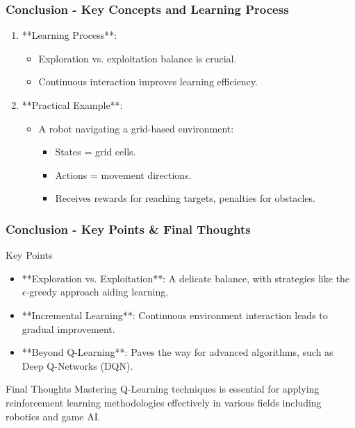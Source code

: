 \documentclass[aspectratio=169]{beamer}
\begin{document}
\begin{frame}[fragile]
    \frametitle{Conclusion - Key Concepts and Learning Process}
    \begin{enumerate}
        \item **Learning Process**:
            \begin{itemize}
                \item Exploration vs. exploitation balance is crucial.
                \item Continuous interaction improves learning efficiency.
            \end{itemize}
        
        \item **Practical Example**:
            \begin{itemize}
                \item A robot navigating a grid-based environment:
                \begin{itemize}
                    \item States = grid cells.
                    \item Actions = movement directions.
                    \item Receives rewards for reaching targets, penalties for obstacles.
                \end{itemize}
            \end{itemize}
    \end{enumerate}
\end{frame}

\begin{frame}[fragile]
    \frametitle{Conclusion - Key Points & Final Thoughts}
    \begin{block}{Key Points}
        \begin{itemize}
            \item **Exploration vs. Exploitation**: A delicate balance, with strategies like the $\epsilon$-greedy approach aiding learning.
            \item **Incremental Learning**: Continuous environment interaction leads to gradual improvement.
            \item **Beyond Q-Learning**: Paves the way for advanced algorithms, such as Deep Q-Networks (DQN).
        \end{itemize}
    \end{block}
    
    \begin{block}{Final Thoughts}
        Mastering Q-Learning techniques is essential for applying reinforcement learning methodologies effectively in various fields including robotics and game AI.
    \end{block}
\end{frame}
\end{document}
